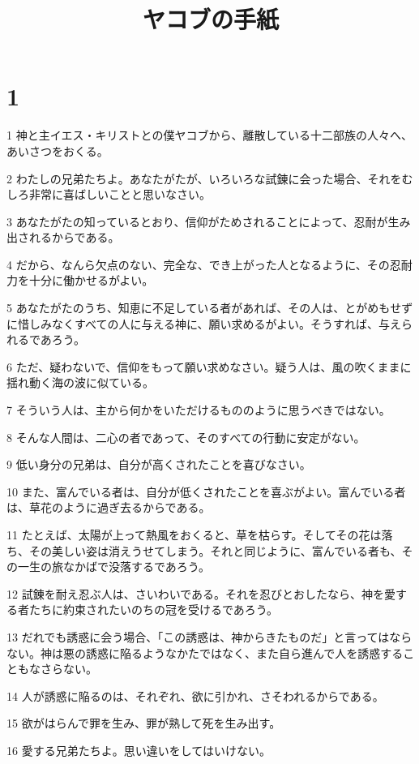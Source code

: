 

\title{ヤコブの手紙}


\chapter{1}

\par 1 神と主イエス・キリストとの僕ヤコブから、離散している十二部族の人々へ、あいさつをおくる。
\par 2 わたしの兄弟たちよ。あなたがたが、いろいろな試錬に会った場合、それをむしろ非常に喜ばしいことと思いなさい。
\par 3 あなたがたの知っているとおり、信仰がためされることによって、忍耐が生み出されるからである。
\par 4 だから、なんら欠点のない、完全な、でき上がった人となるように、その忍耐力を十分に働かせるがよい。
\par 5 あなたがたのうち、知恵に不足している者があれば、その人は、とがめもせずに惜しみなくすべての人に与える神に、願い求めるがよい。そうすれば、与えられるであろう。
\par 6 ただ、疑わないで、信仰をもって願い求めなさい。疑う人は、風の吹くままに揺れ動く海の波に似ている。
\par 7 そういう人は、主から何かをいただけるもののように思うべきではない。
\par 8 そんな人間は、二心の者であって、そのすべての行動に安定がない。
\par 9 低い身分の兄弟は、自分が高くされたことを喜びなさい。
\par 10 また、富んでいる者は、自分が低くされたことを喜ぶがよい。富んでいる者は、草花のように過ぎ去るからである。
\par 11 たとえば、太陽が上って熱風をおくると、草を枯らす。そしてその花は落ち、その美しい姿は消えうせてしまう。それと同じように、富んでいる者も、その一生の旅なかばで没落するであろう。
\par 12 試錬を耐え忍ぶ人は、さいわいである。それを忍びとおしたなら、神を愛する者たちに約束されたいのちの冠を受けるであろう。
\par 13 だれでも誘惑に会う場合、「この誘惑は、神からきたものだ」と言ってはならない。神は悪の誘惑に陥るようなかたではなく、また自ら進んで人を誘惑することもなさらない。
\par 14 人が誘惑に陥るのは、それぞれ、欲に引かれ、さそわれるからである。
\par 15 欲がはらんで罪を生み、罪が熟して死を生み出す。
\par 16 愛する兄弟たちよ。思い違いをしてはいけない。
